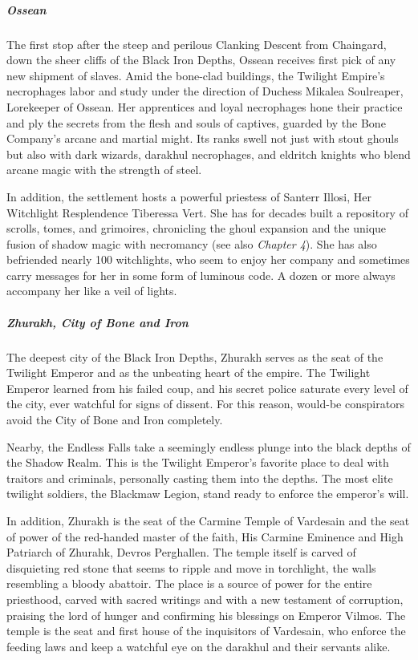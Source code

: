 \documentclass[10pt,a4paper,twoside,bg=print,twocolumn,openany,nodeprecatedcode]{dndbook}
\begin{document}
\subparagraph{Ossean}
The first stop after the steep and perilous Clanking Descent from Chaingard, down the sheer cliffs of the Black Iron Depths, Ossean receives first pick of any new shipment of slaves. Amid the bone-clad buildings, the Twilight Empire's necrophages labor and study under the direction of Duchess Mikalea Soulreaper, Lorekeeper of Ossean. Her apprentices and loyal necrophages hone their practice and ply the secrets from the flesh and souls of captives, guarded by the Bone Company's arcane and martial might. Its ranks swell not just with stout ghouls but also with dark wizards, darakhul necrophages, and eldritch knights who blend arcane magic with the strength of steel.

In addition, the settlement hosts a powerful priestess of Santerr Illosi, Her Witchlight Resplendence Tiberessa Vert. She has for decades built a repository of scrolls, tomes, and grimoires, chronicling the ghoul expansion and the unique fusion of shadow magic with necromancy (see also \textit{Chapter 4}). She has also befriended nearly 100 witchlights, who seem to enjoy her company and sometimes carry messages for her in some form of luminous code. A dozen or more always accompany her like a veil of lights.

\subparagraph{Zhurakh, City of Bone and Iron}
The deepest city of the Black Iron Depths, Zhurakh serves as the seat of the Twilight Emperor and as the unbeating heart of the empire. The Twilight Emperor learned from his failed coup, and his secret police saturate every level of the city, ever watchful for signs of dissent. For this reason, would-be conspirators avoid the City of Bone and Iron completely.

Nearby, the Endless Falls take a seemingly endless plunge into the black depths of the Shadow Realm. This is the Twilight Emperor's favorite place to deal with traitors and criminals, personally casting them into the depths. The most elite twilight soldiers, the Blackmaw Legion, stand ready to enforce the emperor's will.

In addition, Zhurakh is the seat of the Carmine Temple of Vardesain and the seat of power of the red-handed master of the faith, His Carmine Eminence and High Patriarch of Zhurahk, Devros Perghallen. The temple itself is carved of disquieting red stone that seems to ripple and move in torchlight, the walls resembling a bloody abattoir. The place is a source of power for the entire priesthood, carved with sacred writings and with a new testament of corruption, praising the lord of hunger and confirming his blessings on Emperor Vilmos. The temple is the seat and first house of the inquisitors of Vardesain, who enforce the feeding laws and keep a watchful eye on the darakhul and their servants alike.
\end{document}
